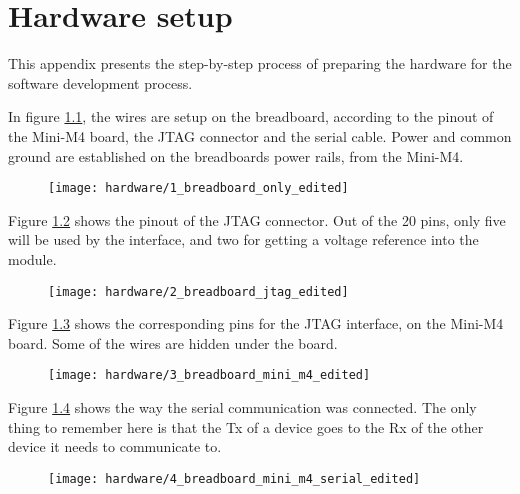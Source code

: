 \chapter{Hardware setup}\label{app:hardware_setup}

This appendix presents the step-by-step process of preparing the hardware
for the software development process.

In figure \ref{figAPP:hardware_setup_1}, 
the wires are setup on the breadboard, according to the
pinout of the Mini-M4 board, the JTAG connector and the serial cable.
Power and common ground are established on the breadboard\textquotesingle s
power rails, from the Mini-M4.

\begin{figure} [h]
\texttt{[image: hardware/1\_breadboard\_only\_edited]}
\label{figAPP:hardware_setup_1}
\end{figure}

Figure \ref{figAPP:hardware_setup_2}
shows the pinout of the JTAG connector. Out of the 20 pins, only
five will be used by the interface, and two for getting a voltage reference
into the module.
\begin{figure} [h]
\texttt{[image: hardware/2\_breadboard\_jtag\_edited]}
\label{figAPP:hardware_setup_2}
\end{figure}

Figure \ref{figAPP:hardware_setup_3}
shows the corresponding pins for the JTAG interface, on the Mini-M4
board. Some of the wires are hidden under the board.
\begin{figure} [H]
\texttt{[image: hardware/3\_breadboard\_mini\_m4\_edited]}
\label{figAPP:hardware_setup_3}
\end{figure}

Figure \ref{figAPP:hardware_setup_4} 
shows the way the serial communication was connected. The only thing to
remember here is that the Tx of a device goes to the Rx of the 
other device it needs to communicate to.
\begin{figure} [h]
\texttt{[image: hardware/4\_breadboard\_mini\_m4\_serial\_edited]}
\label{figAPP:hardware_setup_4}
\end{figure}